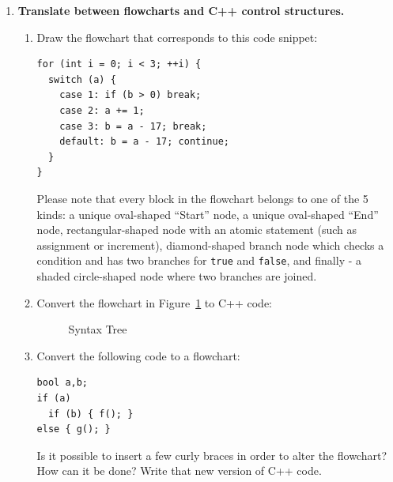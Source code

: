 \documentclass[a4paper,12pt]{article}
\begin{document}
\begin{enumerate}[label=1.\Alph*.]
\item {\bf Translate between flowcharts and C++ control structures.}
\begin{enumerate}
\item
Draw the flowchart that corresponds to this code snippet: 
\begin{verbatim}
for (int i = 0; i < 3; ++i) {
  switch (a) {
    case 1: if (b > 0) break; 
    case 2: a += 1; 
    case 3: b = a - 17; break;
    default: b = a - 17; continue;
  }
}
\end{verbatim}
Please note that every block in the flowchart belongs to one of the 5 kinds: 
a unique oval-shaped ``Start'' node, a unique oval-shaped ``End'' node, 
rectangular-shaped node with an atomic statement (such as assignment or increment), 
diamond-shaped branch node which checks a condition and has two branches for {\tt true}
and {\tt false}, and finally - a shaded circle-shaped node where two branches 
are joined.
\item Convert the flowchart in Figure~\ref{fig:flowchart} to C++ code: 
\begin{figure}[!htb]
\caption{\label{fig:flowchart} Syntax Tree}
\end{figure}
\item 
Convert the following code to a flowchart:
\begin{verbatim}
bool a,b;
if (a) 
  if (b) { f(); }
else { g(); }
\end{verbatim}
Is it possible to insert a few curly braces in order to alter the flowchart? 
How can it be done? Write that new version of C++ code.
\end{enumerate}



\end{enumerate}
\end{document}
